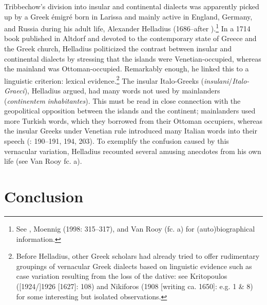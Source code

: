 Tribbechow’s division into insular and continental dialects was apparently picked up by a Greek émigré born in Larissa and mainly active in England, Germany, and Russia during his adult life, Alexander Helladius (1686–after \citealt{September1715}).\footnote{See \citet{Helladius1714}, Moennig (1998: 315–317), and Van Rooy (fc. a) for (auto)biographical information.} In a 1714 book published in Altdorf and devoted to the contemporary state of Greece and the Greek church, Helladius politicized the contrast between insular and continental dialects by stressing that the islands were Venetian-occupied, whereas the mainland was Ottoman-occupied. Remarkably enough, he linked this to a linguistic criterion: lexical evidence.\footnote{Before Helladius, other Greek scholars had already tried to offer rudimentary groupings of vernacular Greek dialects based on linguistic evidence such as case variation resulting from the loss of the dative: see Kritopoulos ([1924/]1926 [1627]: 108) and Nikiforos (1908 [writing ca. 1650]: e.g. 1 \& 8) for some interesting but isolated observations.} The insular Italo-Greeks (\textit{insulani}/\textit{Italo-Graeci}), Helladius argued, had many words not used by mainlanders (\textit{continentem} \textit{inhabitantes}). This must be read in close connection with the geopolitical opposition between the islands and the continent; mainlanders used more Turkish words, which they borrowed from their Ottoman occupiers, whereas the insular Greeks under Venetian rule introduced many Italian words into their speech (\citealt{Helladius1714}: 190–191, 194, 203). To exemplify the confusion caused by this vernacular variation, Helladius recounted several amusing anecdotes from his own life (see Van Rooy fc. a).

\section{Conclusion}

